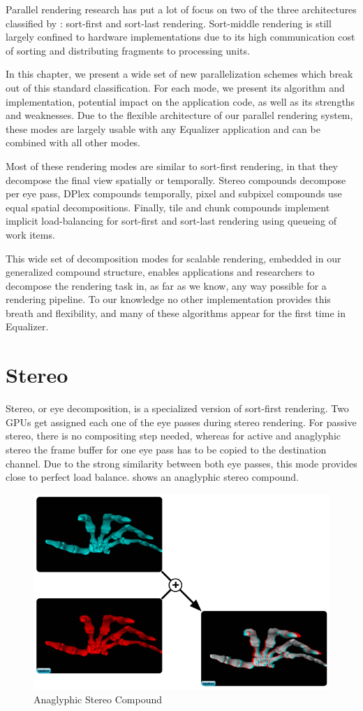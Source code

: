 Parallel rendering research has put a lot of focus on two of the three
architectures classified by \cite{Molnar92}: sort-first and sort-last rendering.
Sort-middle rendering is still largely confined to hardware implementations due
to its high communication cost of sorting and distributing fragments to
processing units.

In this chapter, we present a wide set of new parallelization schemes which
break out of this standard classification. For each mode, we present its
algorithm and implementation, potential impact on the application code, as well
as its strengths and weaknesses. Due to the flexible architecture of our
parallel rendering system, these modes are largely usable with any Equalizer
application and can be combined with all other modes.

Most of these rendering modes are similar to sort-first rendering, in that they
decompose the final view spatially or temporally. Stereo compounds decompose per
eye pass, DPlex compounds temporally, pixel and subpixel compounds use equal
spatial decompositions. Finally, tile and chunk compounds implement implicit
load-balancing for sort-first and sort-last rendering using queueing of work
items.

This wide set of decomposition modes for scalable rendering, embedded in our
generalized compound structure, enables applications and researchers to
decompose the rendering task in, as far as we know, any way possible for a
rendering pipeline. To our knowledge no other implementation provides this
breath and flexibility, and many of these algorithms appear for the first time
in Equalizer.

\section{Stereo}

Stereo, or eye decomposition, is a specialized version of sort-first rendering.
Two GPUs get assigned each one of the eye passes during stereo rendering. For
passive stereo, there is no compositing step needed, whereas for active and
anaglyphic stereo the frame buffer for one eye pass has to be copied to the
destination channel. Due to the strong similarity between both eye passes, this
mode provides close to perfect load balance.  shows an anaglyphic
stereo compound.

\begin{figure}
 \includegraphics[width=.618\textwidth]{images/Stereo}
 {\caption{\label{fStereo}Anaglyphic Stereo Compound}}
\end{figure}

